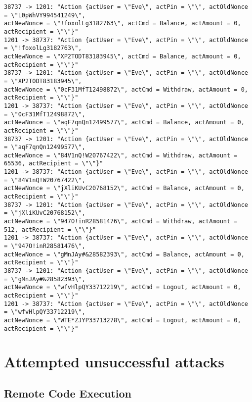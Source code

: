 \documentclass[12pt]{article}
\begin{document}
\begin{Verbatim}[frame=single,fontsize=\scriptsize]
38737 -> 1201: "Action {actUser = \"Eve\", actPin = \"\", actOldNonce = \"L0pWhVY994541249\", 
actNewNonce = \"!foxolLg3182763\", actCmd = Balance, actAmount = 0, actRecipient = \"\"}"
1201 -> 38737: "Action {actUser = \"Eve\", actPin = \"\", actOldNonce = \"!foxolLg3182763\", 
actNewNonce = \"XP2TODT83183945\", actCmd = Balance, actAmount = 0, actRecipient = \"\"}"
38737 -> 1201: "Action {actUser = \"Eve\", actPin = \"\", actOldNonce = \"XP2TODT83183945\", 
actNewNonce = \"0cF31MfT12498872\", actCmd = Withdraw, actAmount = 0, actRecipient = \"\"}"
1201 -> 38737: "Action {actUser = \"Eve\", actPin = \"\", actOldNonce = \"0cF31MfT12498872\", 
actNewNonce = \"aqF7qnQn12499577\", actCmd = Balance, actAmount = 0, actRecipient = \"\"}"
38737 -> 1201: "Action {actUser = \"Eve\", actPin = \"\", actOldNonce = \"aqF7qnQn12499577\", 
actNewNonce = \"84V1nQ!W20767422\", actCmd = Withdraw, actAmount = 65536, actRecipient = \"\"}"
1201 -> 38737: "Action {actUser = \"Eve\", actPin = \"\", actOldNonce = \"84V1nQ!W20767422\", 
actNewNonce = \"jXliKUvC20768152\", actCmd = Balance, actAmount = 0, actRecipient = \"\"}"
38737 -> 1201: "Action {actUser = \"Eve\", actPin = \"\", actOldNonce = \"jXliKUvC20768152\", 
actNewNonce = \"947O!inR28581476\", actCmd = Withdraw, actAmount = 512, actRecipient = \"\"}"
1201 -> 38737: "Action {actUser = \"Eve\", actPin = \"\", actOldNonce = \"947O!inR28581476\", 
actNewNonce = \"gMnJAy#&28582393\", actCmd = Balance, actAmount = 0, actRecipient = \"\"}"
38737 -> 1201: "Action {actUser = \"Eve\", actPin = \"\", actOldNonce = \"gMnJAy#&28582393\", 
actNewNonce = \"wfvHlpQY33712219\", actCmd = Logout, actAmount = 0, actRecipient = \"\"}"
1201 -> 38737: "Action {actUser = \"Eve\", actPin = \"\", actOldNonce = \"wfvHlpQY33712219\", 
actNewNonce = \"WTE*ZJYP33713278\", actCmd = Logout, actAmount = 0, actRecipient = \"\"}"
\end{Verbatim}
\section*{Attempted unsuccessful attacks}
\subsection*{Remote Code Execution}
\end{document}
